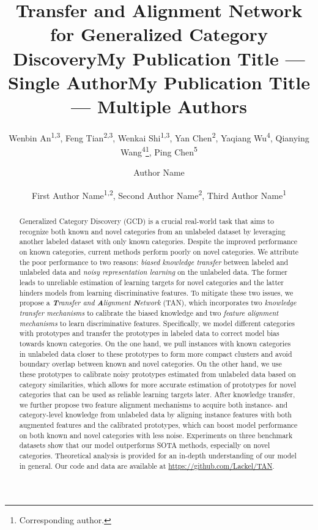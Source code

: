 \documentclass[letterpaper]{article} %
\title{Transfer and Alignment Network for Generalized Category Discovery}
\author{
    Wenbin An\textsuperscript{\rm 1,3}, Feng Tian\textsuperscript{\rm 2,3}\footnotemark[1], Wenkai Shi\textsuperscript{\rm 1,3}, Yan Chen\textsuperscript{\rm 2}, Yaqiang Wu\textsuperscript{\rm 4}, Qianying Wang\textsuperscript{\rm 4}\thanks{Corresponding author.}, Ping Chen\textsuperscript{\rm 5}\\
}
\title{My Publication Title --- Single Author}
\author {
    Author Name
}
\title{My Publication Title --- Multiple Authors}
\author {
    First Author Name\textsuperscript{\rm 1,\rm 2},
    Second Author Name\textsuperscript{\rm 2},
    Third Author Name\textsuperscript{\rm 1}
}
\begin{document}
\maketitle
\begin{abstract}
Generalized Category Discovery (GCD) is a crucial real-world task that aims to recognize both known and novel categories from an unlabeled dataset by leveraging another labeled dataset with only known categories.
Despite the improved performance on known categories, current methods perform poorly on novel categories.
We attribute the poor performance to two reasons: \textit{biased knowledge transfer} between labeled and unlabeled data and \textit{noisy representation learning} on the unlabeled data. The former leads to unreliable estimation of learning targets for novel categories and the latter hinders models from learning discriminative features.
To mitigate these two issues, we propose a \textit{\textbf{T}ransfer and \textbf{A}lignment \textbf{N}etwork} (TAN), which incorporates two \textit{knowledge transfer mechanisms} to calibrate the biased knowledge and two \textit{feature alignment mechanisms} to learn discriminative features.
Specifically, we model different categories with prototypes and transfer the prototypes in labeled data to correct model bias towards known categories.
On the one hand, we pull instances with known categories in unlabeled data closer to these prototypes to form more compact clusters and avoid boundary overlap between known and novel categories. On the other hand, we use these prototypes to calibrate noisy prototypes estimated from unlabeled data based on category similarities, which allows for more accurate estimation of prototypes for novel categories that can be used as reliable learning targets later.
After knowledge transfer, we further propose two feature alignment mechanisms to acquire both instance- and category-level knowledge from unlabeled data by aligning instance features with both augmented features and the calibrated prototypes, which can boost model performance on both known and novel categories with less noise.
Experiments on three benchmark datasets show that our model outperforms SOTA methods, especially on novel categories. Theoretical analysis is provided for an in-depth understanding of our model in general.
Our code and data are available at \url{https://github.com/Lackel/TAN}.

\end{abstract}
\end{document}
